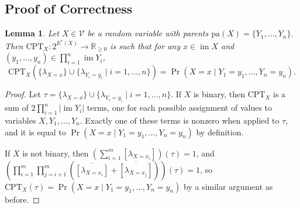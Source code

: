 \documentclass{article}
\newtheorem{lemma}{Lemma}
\theoremstyle{definition}
\theoremstyle{remark}
\DeclareMathOperator{\im}{im}
\begin{document}
{\subsection{Proof of Correctness}

\begin{lemma} \label{lemma:cpt}
  Let $X \in \mathcal{V}$ be a random variable with parents $\mathrm{pa}(X) = \{ Y_1,
  \dots, Y_n \}$. Then $\mathrm{CPT}_X\colon 2^{E^*(X)} \to \mathbb{R}_{\ge 0}$
  is such that for any $x \in \im X$ and $(y_1, \dots, y_n) \in \prod_{i=1}^n
  \im Y_i$,
  \[
    \mathrm{CPT}_X (\{ \lambda_{X=x} \} \cup \{ \lambda_{Y_i=y_i} \mid i = 1,
    \dots, n \}) = \Pr(X = x \mid Y_1 = y_1, \dots, Y_n = y_n).
  \]
\end{lemma}
\begin{proof}
  Let $\tau = \{ \lambda_{X=x} \} \cup \{ \lambda_{Y_i=y_i} \mid i = 1, \dots, n
  \}$. If $X$ is binary, then $\mathrm{CPT}_X$ is a sum of $2\prod_{i=1}^n |\im
  Y_i|$ terms, one for each possible assignment of values to variables $X, Y_1,
  \dots, Y_n$. Exactly one of these terms is nonzero when applied to $\tau$, and
  it is equal to $\Pr(X = x \mid Y_1 = y_1, \dots, Y_n = y_n)$ by definition.

  If $X$ is not binary, then $\left( \sum_{i=1}^m [\lambda_{X = x_i}]
  \right)(\tau) = 1$, and $\left( \prod_{i=1}^m \prod_{j=i+1}^m
    (\overline{[\lambda_{X = x_i}]} + \overline{[\lambda_{X = x_j}]})
  \right)(\tau) = 1$, so $\mathrm{CPT}_X(\tau) = \Pr(X = x \mid Y_1 = y_1,
  \dots, Y_n = y_n)$ by a similar argument as before.
\end{proof}

}
\end{document}
